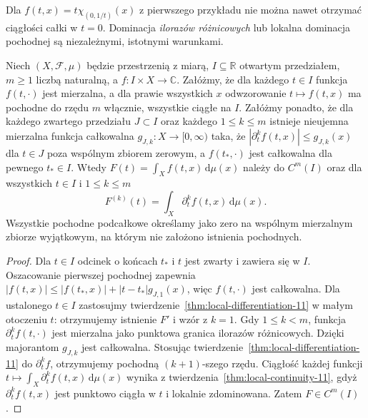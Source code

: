\begin{uwaga}
Dla $f(t,x)=t\chi_{(0,1/t)}(x)$ z pierwszego przykładu
nie można nawet otrzymać ciągłości całki w $t=0$.
Dominacja \emph{ilorazów różnicowych} lub lokalna dominacja
pochodnej są niezależnymi, istotnymi warunkami.
\end{uwaga}

\begin{twierdzenie}
\label{thm:higher-differentiation-11}
Niech $(X,\mathcal F,\mu)$ będzie przestrzenią z miarą,
$I\subseteq\mathbb R$ otwartym przedziałem,
$m\ge1$ liczbą naturalną, a $f:I\times X\to\mathbb C$.
Załóżmy, że dla każdego $t\in I$ funkcja $f(t,\cdot)$ jest mierzalna,
a dla prawie wszystkich $x$ odwzorowanie $t\mapsto f(t,x)$
ma pochodne do rzędu $m$ włącznie, wszystkie ciągłe na $I$.
Załóżmy ponadto, że dla każdego zwartego przedziału
$J\subset I$ oraz każdego $1\le k\le m$
istnieje nieujemna mierzalna funkcja całkowalna
$g_{J,k}:X\to[0,\infty)$ taka, że
$|\partial_t^k f(t,x)|\le g_{J,k}(x)$ dla $t\in J$
poza wspólnym zbiorem zerowym, a $f(t_*,\cdot)$ jest
całkowalna dla pewnego $t_*\in I$.
Wtedy $F(t)=\int_Xf(t,x)\,\mathrm d\mu(x)$ należy
do $C^m(I)$ oraz dla wszystkich $t\in I$ i $1\le k\le m$
\begin{equation}\label{eq:higher-param-11}
F^{(k)}(t)=\int_X\partial_t^k f(t,x)\,\mathrm d\mu(x).
\end{equation}
Wszystkie pochodne podcałkowe określamy jako zero na
wspólnym mierzalnym zbiorze wyjątkowym, na którym
nie założono istnienia pochodnych.
\end{twierdzenie}
\begin{proof}
Dla $t\in I$ odcinek o końcach $t_*$ i $t$ jest zwarty
i zawiera się w $I$. Oszacowanie pierwszej pochodnej
zapewnia $|f(t,x)|\le|f(t_*,x)|+|t-t_*|g_{J,1}(x)$,
więc $f(t,\cdot)$ jest całkowalna. Dla ustalonego
$t\in I$ zastosujmy twierdzenie~\ref{thm:local-differentiation-11}
w małym otoczeniu $t$: otrzymujemy istnienie $F'$ i wzór
z $k=1$. Gdy $1\le k<m$, funkcja $\partial_t^kf(t,\cdot)$
jest mierzalna jako punktowa granica ilorazów różnicowych.
Dzięki majorantom $g_{J,k}$ jest całkowalna. Stosując
twierdzenie~\ref{thm:local-differentiation-11} do
$\partial_t^kf$, otrzymujemy pochodną $(k+1)$-szego rzędu.
Ciągłość każdej funkcji $t\mapsto\int_X\partial_t^kf(t,x)\,\mathrm d\mu(x)$
wynika z twierdzenia~\ref{thm:local-continuity-11},
gdyż $\partial_t^kf(t,x)$ jest punktowo ciągła w $t$
i lokalnie zdominowana. Zatem $F\in C^m(I)$.
\end{proof}

